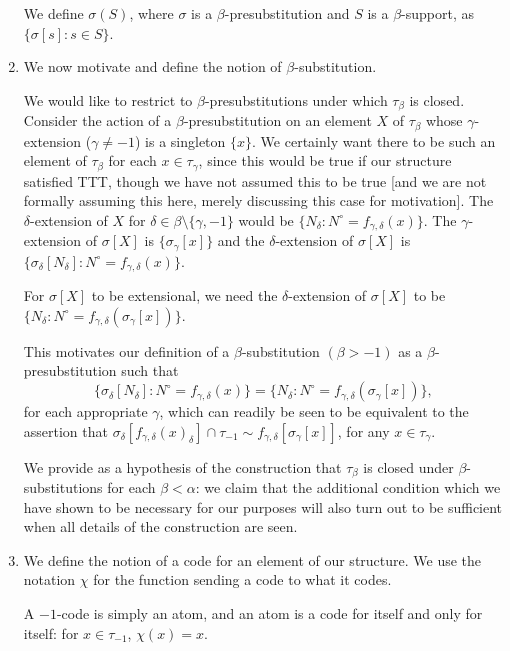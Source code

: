 \documentclass[12pt]{article}
\begin{document}
\begin{enumerate}
We define $\sigma(S)$, where $\sigma$ is a $\beta$-presubstitution and $S$ is a $\beta$-support, as $\{\sigma[s]:s \in S\}$.

\item  We now motivate and define the notion of $\beta$-substitution.

We would like to restrict to $\beta$-presubstitutions under which $\tau_\beta$ is closed.  Consider the action of a $\beta$-presubstitution on an element $X$ of $\tau_\beta$ whose $\gamma$-extension ($\gamma \neq -1$) is a singleton $\{x\}$.  We certainly want there to be such an element of $\tau_\beta$
for each $x \in \tau_\gamma$, since this would be true if our structure satisfied TTT, though we have not assumed this to be true [and we are not formally assuming this here, merely discussing this case for motivation].  The $\delta$-extension of $X$ for $\delta \in \beta \setminus \{\gamma,-1\}$ would be $\{N_\delta:N^\circ = f_{\gamma,\delta}(x)\}$.
The $\gamma$-extension of $\sigma[X]$ is $\{\sigma_\gamma[x]\}$ and the $\delta$-extension of $\sigma[X]$ is $\{\sigma_\delta[N_\delta]:N^\circ = f_{\gamma,\delta}(x)\}$.  

For $\sigma[X]$ to be extensional, we need the $\delta$-extension of $\sigma[X]$ to be $\{N_\delta:N^\circ = f_{\gamma,\delta}(\sigma_\gamma[x])\}$.

This motivates our definition of a $\beta$-substitution $(\beta>-1)$ as a $\beta$-presubstitution such that $$\{\sigma_\delta[N_\delta]:N^\circ = f_{\gamma,\delta}(x)\} = \{N_\delta:N^\circ = f_{\gamma,\delta}(\sigma_\gamma[x])\},$$ for each appropriate $\gamma$, which can readily be seen to be equivalent to the assertion that
$\sigma_\delta[f_{\gamma,\delta}(x)_\delta] \cap \tau_{-1} \sim  f_{\gamma,\delta}[\sigma_\gamma[x]]$, for any $x \in \tau_\gamma$.

We provide as a hypothesis of the construction that $\tau_\beta$ is closed under $\beta$-substitutions for each $\beta<\alpha$:  we claim that the additional condition which we have shown to be necessary for our purposes will also turn out to be sufficient when all details of the construction are seen.

\item We define the notion of a code for an element of our structure.  We use the notation $\chi$ for the function sending a code to what it codes.

A $-1$-code is simply an atom, and an atom is a code for itself and only for itself:  for $x \in \tau_{-1}$, $\chi(x)=x$.


\end{enumerate}
\end{document}
